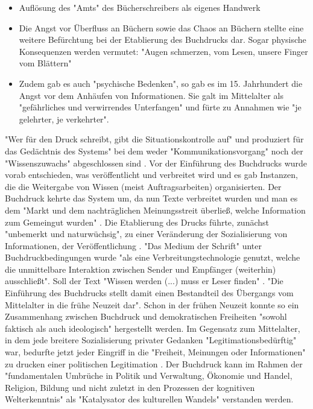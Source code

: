 \begin{itemize}
\item Auflösung des "Amts" des Bücherschreibers als eigenes Handwerk
\item Die Angst vor Überfluss an Büchern sowie das Chaos an Büchern stellte eine weitere Befürchtung bei der Etablierung des Buchdrucks dar. Sogar physische Konsequenzen werden vermutet: "Augen schmerzen, vom Lesen, unsere Finger vom Blättern" \cite{giesecke_1991_buchdruck}
\item Zudem gab es auch "psychische Bedenken", so gab es im 15. Jahrhundert die Angst vor dem Anhäufen von Informationen. Sie galt im Mittelalter als "gefährliches und verwirrendes Unterfangen" und fürte zu Annahmen wie "je gelehrter, je verkehrter". \cite{giesecke_1991_buchdruck}
\end{itemize}

"Wer für den Druck schreibt, gibt die Situationskontrolle auf" und produziert für das Gedächtnis des Systems" bei dem weder "Kommunikationsvorgang" noch der "Wissenszuwachs" abgeschlossen sind \cite{Luhmann1998}. Vor der Einführung des Buchdrucks wurde vorab entschieden, was veröffentlicht und verbreitet wird und es gab Instanzen, die die Weitergabe von Wissen (meist Auftragsarbeiten) organisierten. Der Buchdruck kehrte das System um, da nun Texte verbreitet wurden und man es dem "Markt und dem nachträglichen Meinungsstreit überließ, welche Information zum Gemeingut wurden" \cite{giesecke_1991_buchdruck}. Die Etablierung des Drucks führte, zunächst "unbemerkt und naturwüchsig", zu einer Veränderung der Sozialisierung von Informationen, der Veröffentlichung \cite{giesecke_1991_buchdruck}. "Das Medium der Schrift" unter Buchdruckbedingungen wurde "als eine Verbreitungstechnologie genutzt, welche die unmittelbare Interaktion zwischen Sender und Empfänger (weiterhin) ausschließt". Soll der Text "Wissen werden (...) muss er Leser finden" \cite{Luhmann1998}. "Die Einführung des Buchdrucks stellt damit einen Bestandteil des Übergangs vom Mittelalter in die frühe Neuzeit dar"\cite{lange2008medienwettbewerb}. Schon in der frühen Neuzeit konnte so ein Zusammenhang zwischen Buchdruck und demokratischen Freiheiten "sowohl faktisch als auch ideologisch" \cite{suchen} hergestellt werden. Im Gegensatz zum Mittelalter, in dem jede breitere Sozialisierung privater Gedanken "Legitimationsbedürftig" war, bedurfte jetzt jeder Eingriff in die "Freiheit, Meinungen oder Informationen" zu drucken einer politischen Legitimation \cite{giesecke_1991_buchdruck}. Der Buchdruck kann im Rahmen der "fundamentalen Umbrüche in Politik und Verwaltung, Ökonomie und Handel, Religion, Bildung und nicht zuletzt in den Prozessen der kognitiven Welterkenntnis" \cite{pscheida_2010_wikipedia} als "Katalysator des kulturellen Wandels"\cite{giesecke_1991_buchdruck} verstanden werden.

